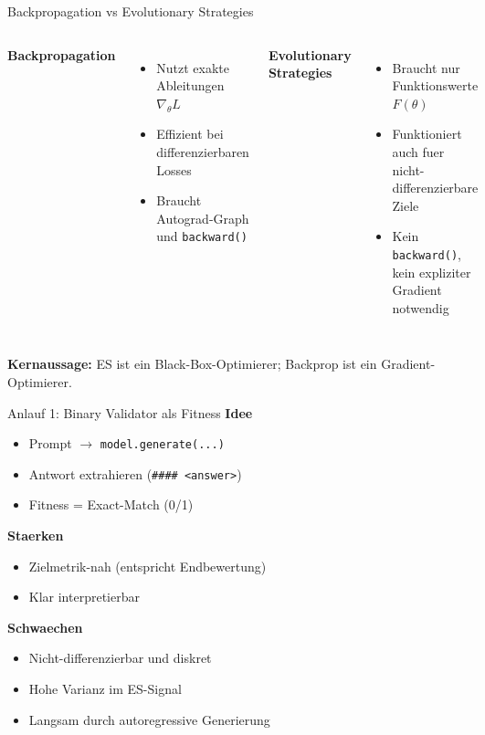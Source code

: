 \documentclass[aspectratio=169,11pt]{beamer}
\begin{document}
\begin{frame}{Backpropagation vs Evolutionary Strategies}
\begin{columns}[T]
\textbf{Backpropagation}
\begin{itemize}
  \item Nutzt exakte Ableitungen $\nabla_\theta L$
  \item Effizient bei differenzierbaren Losses
  \item Braucht Autograd-Graph und \texttt{backward()}
\end{itemize}

\textbf{Evolutionary Strategies}
\begin{itemize}
  \item Braucht nur Funktionswerte $F(\theta)$
  \item Funktioniert auch fuer nicht-differenzierbare Ziele
  \item Kein \texttt{backward()}, kein expliziter Gradient notwendig
\end{itemize}
\end{columns}

\vspace{0.6em}
\textbf{Kernaussage:} ES ist ein Black-Box-Optimierer; Backprop ist ein Gradient-Optimierer.
\end{frame}

\begin{frame}{Anlauf 1: Binary Validator als Fitness}
\textbf{Idee}
\begin{itemize}
  \item Prompt $\rightarrow$ \texttt{model.generate(...)}
  \item Antwort extrahieren (\texttt{#### <answer>})
  \item Fitness = Exact-Match (0/1)
\end{itemize}

\textbf{Staerken}
\begin{itemize}
  \item Zielmetrik-nah (entspricht Endbewertung)
  \item Klar interpretierbar
\end{itemize}

\textbf{Schwaechen}
\begin{itemize}
  \item Nicht-differenzierbar und diskret
  \item Hohe Varianz im ES-Signal
  \item Langsam durch autoregressive Generierung
\end{itemize}
\end{frame}
\end{document}

